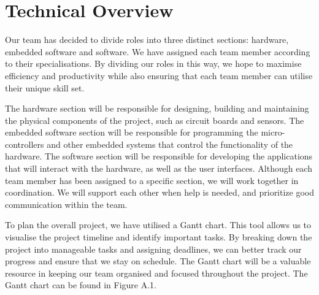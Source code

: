 
\chapter{Technical Overview}

\par Our team has decided to divide roles into three distinct sections: hardware, embedded software and software. We have assigned each team member according to their specialisations. By dividing our roles in this way, we hope to maximise efficiency and productivity while also ensuring that each team member can utilise their unique skill set. 

The hardware section will be responsible for designing, building and maintaining the physical components of the project, such as circuit boards and sensors. The embedded software section will be responsible for programming the micro-controllers and other embedded systems that control the functionality of the hardware. The software section will be responsible for developing the applications that will interact with the hardware, as well as the user interfaces. Although each team member has been assigned to a specific section, we will work together in coordination. We will support each other when help is needed, and prioritize good communication within the team.

To plan the overall project, we have utilised a Gantt chart. This tool allows us to visualise the project timeline and identify important tasks. By breaking down the project into manageable tasks and assigning deadlines, we can better track our progress and ensure that we stay on schedule. The Gantt chart will be a valuable resource in keeping our team organised and focused throughout the project. The Gantt chart can be found in Figure A.1.


